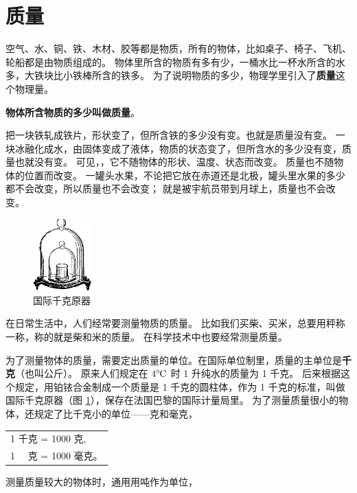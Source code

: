 \section{质量}\label{sec:1-5}

空气、水、铜、铁、木材、胶等都是物质，所有的物体，比如桌子、椅子、飞机、轮船都是由物质组成的。
物体里所含的物质有多有少，一桶水比一杯水所含的水多，大铁块比小铁棒所含的铁多。
为了说明物质的多少，物理学里引入了\textbf{质量}这个物理量。

\textbf{物体所含物质的多少叫做质量}。

把一块铁轧成铁片，形状变了，但所含铁的多少没有变。也就是质量没有变。
一块冰融化成水，由固体变成了液体，物质的状态变了，但所含水的多少没有变，质量也就没有变。
可见，，它不随物体的形状、温度、状态而改变。
质量也不随物体的位置而改变。
一罐头水果，不论把它放在赤道还是北极，罐头里水果的多少都不会改变，所以质量也不会改变；
就是被宇航员带到月球上，质量也不会改变。


\begin{figure}
    \centering
    \includegraphics[width=0.2\textwidth]{../pic/czwl1-ch1-13}
    \caption{国际千克原器}\label{fig:1-13}
\end{figure}


在日常生活中，人们经常要测量物质的质量。
比如我们买柴、买米，总要用秤称一称，称的就是柴和米的质量。
在科学技术中也要经常测量质量。

为了测量物体的质量，需要定出质量的单位。在国际单位制里，质量的主单位是\textbf{千克}（也叫公斤）。
原来人们规定在 $4\celsius$ 时 1 升纯水的质量为 1 千克。
后来根据这个规定，用铂铱合金制成一个质量是 1 千克的圆柱体，作为 1 千克的标准，叫做国际千克原器（图 \ref{fig:1-13}），保存在法国巴黎的国际计量局里。
为了测量质量很小的物体，还规定了比千克小的单位——克和毫克，
\vspace{-1em}\begin{center}
    \begin{tabular}{l}
        1 千克 = 1000 克, \\
        1 　克 = 1000 毫克。 \\
    \end{tabular}
\end{center}\vspace{-1em}
测量质量较大的物体时，通用用吨作为单位，

